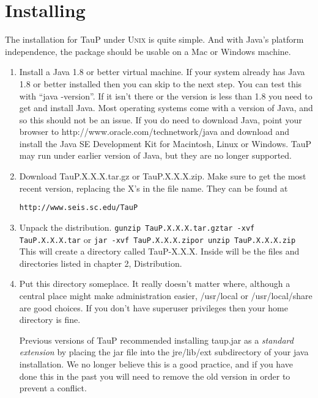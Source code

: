 
\section{Installing}
\label{install}

The installation for TauP under \textsc{Unix} is quite simple. And with Java's
platform independence, the package should be usable on a Mac or Windows
machine.

\begin{enumerate}
\item Install a Java 1.8 or better virtual machine. If your system already has Java 1.8
or better installed then you can skip to the next step. You can test this
with ``java -version''. If it isn't there or the version is less than 1.8
you need to get and install Java. Most operating systems come with a version
of Java, and so this should not be an issue. If you do need to download Java,
point
your browser to http://www.oracle.com/technetwork/java and download and install
the Java SE Development Kit for Macintosh, Linux or Windows. TauP may run under earlier version of Java, but they are no longer supported.

\item Download TauP.X.X.X.tar.gz or TauP.X.X.X.zip. Make sure to get the most recent version, replacing the X's  in the file name. They can be found at

\texttt{http://www.seis.sc.edu/TauP}

\item Unpack the distribution.
\texttt{\newline gunzip TauP.X.X.X.tar.gz\newline tar -xvf TauP.X.X.X.tar\newline}
or
\texttt{\newline jar -xvf TauP.X.X.X.zip\newline or unzip TauP.X.X.X.zip}
This will create a directory called TauP-X.X.X. Inside
will be the files and directories listed in chapter 2, Distribution.

\item Put this directory someplace. It really doesn't matter where, although
a central place might make administration easier, /usr/local or
/usr/local/share are good choices. If you don't have superuser privileges
then your home directory is fine.

Previous versions of TauP recommended installing taup.jar as a \textit{standard extension} by placing the jar file into the jre/lib/ext subdirectory of your java installation. We no longer believe this is a good
practice, and if you have done this in the past you will need to remove the old version in order to
prevent a conflict.


\end{enumerate}
